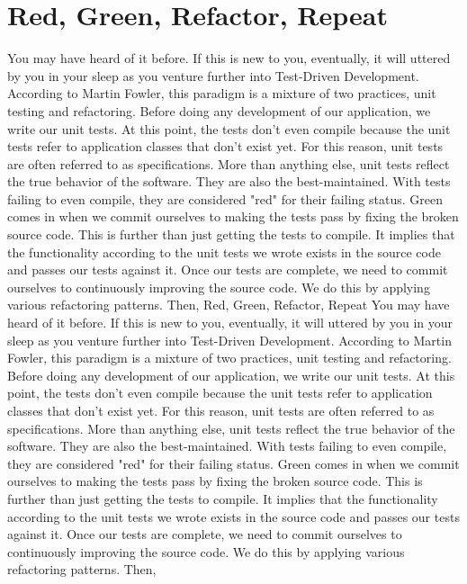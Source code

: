 \documentclass[12pt,notitlepage]{article}
\begin{document}
\section{Red, Green, Refactor, Repeat}
You may have heard of it before. If this is new to you, eventually, it will uttered by you in your sleep as you venture further into Test-Driven Development. According to Martin Fowler, this paradigm is a mixture of two practices, unit testing and refactoring. Before doing any development of our application, we write our unit tests. At this point, the tests don't even compile because the unit tests refer to application classes that don't exist yet. For this reason, unit tests are often referred to as specifications. More than anything else, unit tests reflect the true behavior of the software. They  are also the best-maintained. With tests failing to even compile, they are considered "red" for their failing status. Green comes in when we commit ourselves to making the tests pass by fixing the broken source code. This is further than just getting the tests to compile. It implies that the functionality according to the unit tests we wrote exists in the source code and passes our tests against it. Once our tests are complete, we need to commit ourselves to continuously improving the source code. We do this by applying various refactoring patterns. Then, Red, Green, Refactor, Repeat
You may have heard of it before. If this is new to you, eventually, it will uttered by you in your sleep as you venture further into Test-Driven Development. According to Martin Fowler, this paradigm is a mixture of two practices, unit testing and refactoring. Before doing any development of our application, we write our unit tests. At this point, the tests don't even compile because the unit tests refer to application classes that don't exist yet. For this reason, unit tests are often referred to as specifications. More than anything else, unit tests reflect the true behavior of the software. They  are also the best-maintained. With tests failing to even compile, they are considered "red" for their failing status. Green comes in when we commit ourselves to making the tests pass by fixing the broken source code. This is further than just getting the tests to compile. It implies that the functionality according to the unit tests we wrote exists in the source code and passes our tests against it. Once our tests are complete, we need to commit ourselves to continuously improving the source code. We do this by applying various refactoring patterns. Then, 
\newpage
\listoffigures
\lstlistoflistings
\end{document}
